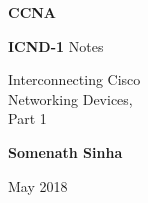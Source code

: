 \begin{titlepage}
    \begin{center}
        \vspace*{1cm}
        
        \Huge
        \textbf{CCNA}
        \vspace*{20pt}
        
        \LARGE
        \textbf{ICND-1} Notes
        
        \large
        Interconnecting Cisco \\
        Networking Devices, \\
        Part 1
        
		\vspace{75pt}
        
		\large
        \textbf{Somenath Sinha}
        
       	\normalsize
       	May 2018
        
    \end{center}
\end{titlepage}